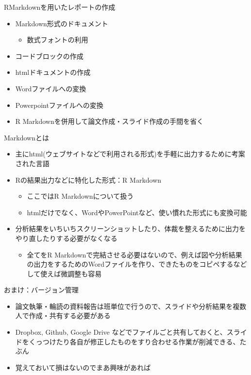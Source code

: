 \documentclass[
  ignorenonframetext,
]{beamer}
\providecommand{\tightlist}{%
  \setlength{\itemsep}{0pt}\setlength{\parskip}{0pt}}
\begin{document}
\begin{frame}{RMarkdownを用いたレポートの作成}
\protect\hypertarget{rmarkdownux3092ux7528ux3044ux305fux30ecux30ddux30fcux30c8ux306eux4f5cux6210}{}
\begin{itemize}
\tightlist
\item
  Markdown形式のドキュメント

  \begin{itemize}
  \tightlist
  \item
    数式フォントの利用
  \end{itemize}
\item
  コードブロックの作成
\item
  htmlドキュメントの作成
\item
  Wordファイルへの変換
\item
  Powerpointファイルへの変換
\item
  R Markdownを併用して論文作成・スライド作成の手間を省く
\end{itemize}

\begin{block}{Markdownとは}
\protect\hypertarget{markdownux3068ux306f}{}
\begin{itemize}
\tightlist
\item
  主にhtml(ウェブサイトなどで利用される形式)を手軽に出力するために考案された言語
\item
  Rの結果出力などに特化した形式：R Markdown

  \begin{itemize}
  \tightlist
  \item
    ここではR Markdownについて扱う
  \item
    htmlだけでなく、WordやPowerPointなど、使い慣れた形式にも変換可能
  \end{itemize}
\item
  分析結果をいちいちスクリーンショットしたり、体裁を整えるために出力をやり直したりする必要がなくなる

  \begin{itemize}
  \tightlist
  \item
    全てをR
    Markdownで完結させる必要はないので、例えば図や分析結果の出力をするためのWordファイルを作り、できたものをコピペするなどして使えば微調整も容易
  \end{itemize}
\end{itemize}
\end{block}
\end{frame}

\begin{frame}{おまけ：バージョン管理}
\protect\hypertarget{ux304aux307eux3051ux30d0ux30fcux30b8ux30e7ux30f3ux7ba1ux7406}{}
\begin{itemize}
\tightlist
\item
  論文執筆・輪読の資料報告は班単位で行うので、スライドや分析結果を複数人で作成・共有する必要がある
\item
  Dropbox, Github, Google Drive
  などでファイルごと共有しておくと、スライドをくっつけたり各自が修正したものをすり合わせる作業が削減できる、たぶん
\item
  覚えておいて損はないのでまあ興味があれば
\end{itemize}
\end{frame}
\end{document}

